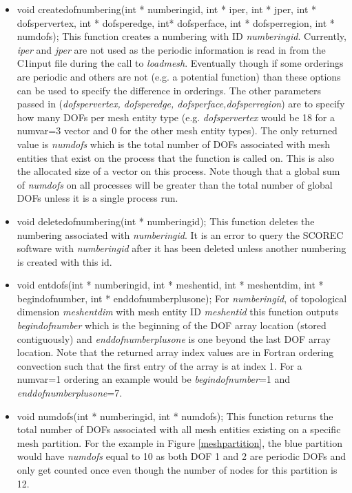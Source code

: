 \begin{itemize}
\item   void createdofnumbering(int * numberingid, int * iper, int * jper,
                           int * dofspervertex, int * dofsperedge, 
                           int* dofsperface, int * dofsperregion, int * numdofs);
 This function creates a numbering with  ID \textit{numberingid}.  Currently, \textit{iper}
and \textit{jper} are not used as the periodic information is read in from the C1input file during the 
call to \textit{loadmesh}.
Eventually though if some orderings are periodic and others are not (e.g. a potential function)
than these options can be used to specify the difference in orderings. The other parameters
passed in (\textit{dofspervertex, dofsperedge, dofsperface,dofsperregion}) are to specify
how many DOFs per mesh entity type (e.g. \textit{dofspervertex} would be 18 for a numvar=3 
vector and 0 for the other mesh entity types).  The only returned value is \textit{numdofs} 
which is the total number of DOFs associated with mesh entities that exist on the process that
the function is called on. This is also the allocated size of a vector on this process.  Note
though that a global sum of \textit{numdofs} on all processes will be greater than the total number
of global DOFs unless it is a single process run. 

\item void deletedofnumbering(int * numberingid);
This function deletes the numbering associated with \textit{numberingid}.  It is an error
to query the SCOREC software with \textit{numberingid} after it has been deleted
unless another numbering is created
with this id.


\item  void entdofs(int * numberingid, int * meshentid, int * meshentdim,
               int * begindofnumber, int * enddofnumberplusone);
     For \textit{numberingid}, of topological dimension \textit{meshentdim} with mesh entity
ID \textit{meshentid} this function outputs \textit{begindofnumber} which is the beginning of
the DOF array location (stored contiguously) and \textit{enddofnumberplusone} is one
beyond the last DOF array location.  Note that the returned array index values are in Fortran
ordering convection such that the first entry of the array is at index 1.
For a numvar=1 ordering an example would be \textit{begindofnumber}=1
and \textit{enddofnumberplusone}=7. 

\item  void numdofs(int * numberingid, int * numdofs); This function returns the total number of 
DOFs associated with all mesh entities existing on a specific mesh partition.  For the example
in Figure \ref{meshpartition}, the blue partition would have \textit{numdofs} equal to 10 as both DOF 1
and 2 are periodic DOFs and only get counted once even though the number of nodes for this 
partition is 12.
  

\end{itemize}
